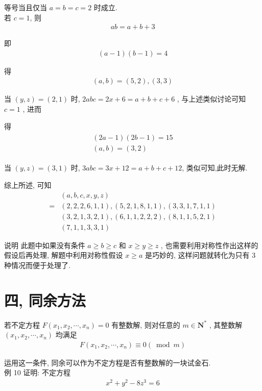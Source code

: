 	等号当且仅当 $a=b=c=2$ 时成立.\\
	若 $c=1$, 则
\begin{align*}
		a b=a+b+3
	\end{align*}

	即
\begin{align*}
		(a-1)(b-1)=4
	\end{align*}

	得
\begin{align*}
		(a, b)=(5,2),(3,3)
	\end{align*}

	当 $(y, z)=(2,1)$ 时, $2 a b c=2 x+6=a+b+c+6$ , 与上述类似讨论可知 $c=1$ , 进而

	得
\begin{align*}
		\begin{gathered}
			(2 a-1)(2 b-1)=15 \\
			(a, b)=(3,2)
		\end{gathered}
	\end{align*}

	当 $(y, z)=(3,1)$ 时, $3 a b c=3 x+12=a+b+c+12$, 类似可知,此时无解.

	综上所述, 可知\begin{align}
		  & (a, b, c, x, y, z)                        \\
		= & (2,2,2,6,1,1),(5,2,1,8,1,1),(3,3,1,7,1,1) \\
		  & (3,2,1,3,2,1),(6,1,1,2,2,2),(8,1,1,5,2,1) \\
		  & (7,1,1,3,3,1)
	\end{align}

	说明 此题中如果没有条件 $a \geqslant b \geqslant c$ 和 $x \geqslant y \geqslant z$ , 也需要利用对称性作出这样的假设后再处理, 解题中利用对称性假设 $x \geqslant a$ 是巧妙的, 这样问题就转化为只有 3 种情况而便于处理了.

	\section{四, 同余方法}
	若不定方程 $F\left(x_{1}, x_{2}, \cdots, x_{n}\right)=0$ 有整数解, 则对任意的 $m \in \mathbf{N}^{*}$ , 其整数解 $\left(x_{1}, x_{2}, \cdots, x_{n}\right)$ 均满足
\begin{align*}
		F\left(x_{1}, x_{2}, \cdots, x_{n}\right) \equiv 0(\bmod m)
	\end{align*}

	运用这一条件, 同余可以作为不定方程是否有整数解的一块试金石. \\
	例 10 证明: 不定方程
\begin{align*}
		x^{2}+y^{2}-8 z^{3}=6
	\end{align*}

